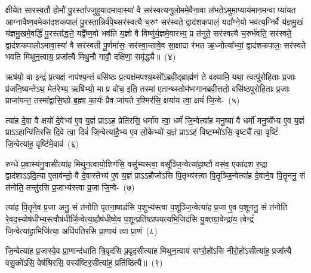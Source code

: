 क्षीयेत सारस्व॒तौ होमौ॑ पु॒रस्ता᳚ज्जुहुयादमावा॒स्या॑ वै सर॑स्वत्यनुलो॒ममे॒वैना॒वा ल॑भते॒\-ऽमुमा॒प्याय॑मान॒मन्वा प्या॑यत आग्नावैष्ण॒वमेका॑\-दश\-कपालं पु॒रस्ता॒न्निर्व॑पे॒थ्सर॑स्वत्यै च॒रुꣳ सर॑स्वते॒ द्वाद॑श\-कपालं॒ यदा᳚ग्ने॒यो भव॑त्य॒ग्निर्वै य॑ज्ञमु॒खं य॑ज्ञमु॒खमे॒वर्द्धिं॑ पु॒रस्ता᳚द्धत्ते॒ यद्वै᳚ष्ण॒वो भव॑ति य॒ज्ञो वै विष्णु॑र्य॒ज्ञमे॒वारभ्य॒ प्र त॑नुते॒ सर॑स्वत्यै च॒रुर्भ॑वति॒ सर॑स्वते॒ द्वाद॑श\-कपालो\-ऽमावा॒स्या॑ वै सर॑स्वती पू॒र्णमा॑सः॒ सर॑स्वा॒न्तावे॒व सा॒क्षादा र॑भत ऋ॒ध्नोत्या᳚भ्यां॒ द्वाद॑श\-कपालः॒ सर॑स्वते भवति मिथुन॒त्वाय॒ प्रजा᳚त्यै मिथु॒नौ गावौ॒ दक्षि॑णा॒ समृ॑द्ध्यै॥~(४)\ip

{}

ऋष॑यो॒ वा इन्द्रं॑ प्र॒त्यक्षं॒ नाप॑श्य॒न्तं वसि॑ष्ठः प्र॒त्यक्ष॑मपश्य॒थ्सो᳚\-ऽब्रवी॒द्ब्राह्म॑णं ते वक्ष्यामि॒ यथा॒ त्वत्पु॑रोहिताः प्र॒जाः प्र॑जनि॒ष्यन्ते\-ऽथ॒ मेत॑रेभ्य॒ ऋषि॑भ्यो॒ मा प्र वो॑च॒ इति॒ तस्मा॑ ए॒तान्थ्स्तोम॑भागानब्रवी॒त्ततो॒ वसि॑ष्ठपुरोहिताः प्र॒जाः प्राजा॑यन्त॒ तस्मा᳚द्\-वासि॒ष्ठो ब्र॒ह्मा का॒र्यः॑ प्रैव जा॑यते र॒श्मिर॑सि॒ क्षया॑य त्वा॒ क्षयं॑ जि॒न्वे-~(५)\ip

त्या॑ह दे॒वा वै क्षयो॑ दे॒वेभ्य॑ ए॒व य॒ज्ञं प्रा\-ऽऽ\-ह॒ प्रेति॑रसि॒ धर्मा॑य त्वा॒ धर्मं॑ जि॒न्वेत्या॑ह मनु॒ष्या॑ वै धर्मो॑ मनु॒ष्ये᳚भ्य ए॒व य॒ज्ञं प्रा\-ऽऽ\-हान्वि॑तिरसि दि॒वे त्वा॒ दिवं॑ जि॒न्वेत्या॑है॒भ्य ए॒व लो॒केभ्यो॑ य॒ज्ञं प्रा\-ऽऽ\-ह॑ विष्ट॒म्भो॑\-ऽसि॒ वृष्ट्यै᳚ त्वा॒ वृष्टिं॑ जि॒न्वेत्या॑ह॒ वृष्टि॑मे॒वाव॑~(६)\ip

रुन्धे प्र॒वास्य॑नु॒वासीत्या॑ह मिथुन॒त्वायो॒शिग॑सि॒ वसु॑भ्यस्त्वा॒ वसू᳚ञ्जि॒न्वेत्या॑हा॒ष्टौ वस॑व॒ एका॑\-दश रु॒द्रा द्वाद॑शा\-ऽऽ\-दि॒त्या ए॒ताव॑न्तो॒ वै दे॒वास्तेभ्य॑ ए॒व य॒ज्ञं प्रा\-ऽऽ\-हौजो॑\-ऽसि पि॒तृभ्य॑स्त्वा पि॒तॄञ्जि॒न्वेत्या॑ह दे॒वाने॒व पि॒तॄननु॒ सं त॑नोति॒ तन्तु॑रसि प्र॒जाभ्य॑स्त्वा प्र॒जा \mbox{जि॒न्वे-~(७)\ip}

त्या॑ह पि॒तॄने॒व प्र॒जा अनु॒ सं त॑नोति पृतना॒षाड॑सि प॒शुभ्य॑स्त्वा प॒शूञ्जि॒न्वेत्या॑ह प्र॒जा ए॒व प॒शूननु॒ सं त॑नोति रे॒वद॒स्योष॑धीभ्य॒स्त्वौष॑धीर्जि॒न्वेत्या॒\-हौष॑धीष्वे॒व प॒शून्प्रति॑\-ष्ठापयत्यभि॒\-जिद॑सि यु॒क्तग्रा॒वेन्द्रा॑य॒ त्वेन्द्रं॑ जि॒न्वेत्या॑हा॒भिजि॑त्या॒ अधि॑\-पतिरसि प्रा॒णाय॑ त्वा प्रा॒णं~(८)\ip

जि॒न्वेत्या॑ह प्र॒जास्वे॒व प्रा॒णान्द॑धाति त्रि॒वृद॑सि प्र॒वृद॒सीत्या॑ह मिथुन॒त्वाय॑ सꣳरो॒हो॑\-ऽसि नीरो॒हो॑\-ऽसीत्या॑ह॒ प्रजा᳚त्यै वसु॒को॑\-ऽसि॒ वेष॑श्रिरसि॒ वस्य॑ष्टिर॒सीत्या॑ह॒ प्रति॑ष्ठित्यै॥~(९)\ip

{\anuvakamend[{जि॒न्वेत्यव॑ प्र॒जा जि॑न्व प्रा॒णन्त्रि॒ꣳ॒शच्च॑}]}


